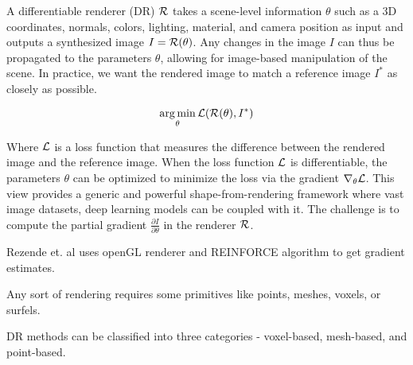 A differentiable renderer (DR) $\mathcal{R}$ takes a scene-level information $\theta$ such as a 3D coordinates, normals, colors, lighting, material, and camera position as input and outputs a synthesized image $I = \mathcal{R}(\theta)$. Any changes in the image $I$ can thus be propagated to the parameters $\theta$, allowing for image-based manipulation of the scene. In practice, we want the rendered image to match a reference image $I^*$ as closely as possible.


$$
\operatorname*{arg\,min}_{\theta} \mathcal{L}(\mathcal{R}(\theta), I^*)
$$

Where $\mathcal{L}$ is a loss function that measures the difference between the rendered image and the reference image. When the loss function $\mathcal{L}$ is differentiable, the parameters $\theta$ can be optimized to minimize the loss via the gradient $\nabla_{\theta}\mathcal{L}$. This view provides a generic and powerful shape-from-rendering framework where vast image datasets, deep learning models can be coupled with it. The challenge is to compute the partial gradient $\frac{\partial I}{\partial \theta}$ in the renderer $\mathcal{R}$.

Rezende et. al uses openGL renderer and REINFORCE algorithm to get gradient estimates.

Any sort of rendering requires some primitives like points, meshes, voxels, or surfels.

DR methods can be classified into three categories - voxel-based, mesh-based, and point-based.
\nocite{*}




